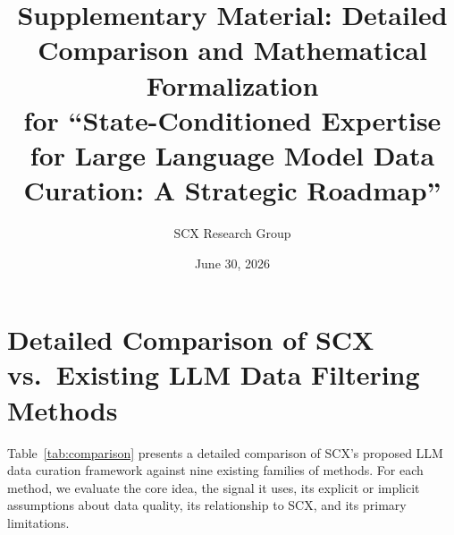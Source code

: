 \documentclass[11pt]{article}
\title{Supplementary Material: Detailed Comparison and Mathematical Formalization\\
       \large for ``State-Conditioned Expertise for Large Language Model Data Curation: A Strategic Roadmap''}
\author{SCX Research Group}
\date{June 30, 2026}
\begin{document}
\maketitle

\tableofcontents

\newpage

\section{Detailed Comparison of SCX vs.\ Existing LLM Data Filtering Methods}

Table~\ref{tab:comparison} presents a detailed comparison of SCX's proposed LLM data curation framework against nine existing families of methods. For each method, we evaluate the core idea, the signal it uses, its explicit or implicit assumptions about data quality, its relationship to SCX, and its primary limitations.
\end{document}
